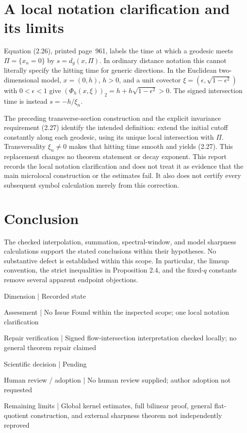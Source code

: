 \documentclass[10pt]{article}
\begin{document}
\section*{A local notation clarification and its limits}
Equation (2.26), printed page 961, labels the time at which a geodesic meets \(\Pi=\{x_n=0\}\) by \(s=d_g(x,\Pi)\). In ordinary distance notation this cannot literally specify the hitting time for generic directions. In the Euclidean two-dimensional model, \(x=(0,h)\), \(h>0\), and a unit covector \(\xi=(\epsilon,\sqrt{1-\epsilon^2})\) with \(0<\epsilon<1\) give \((\Phi_h(x,\xi))_2=h+h\sqrt{1-\epsilon^2}>0\). The signed intersection time is instead \(s=-h/\xi_n\).\par
The preceding transverse-section construction and the explicit invariance requirement (2.27) identify the intended definition: extend the initial cutoff constantly along each geodesic, using its unique local intersection with \(\Pi\). Transversality \(\xi_n\ne0\) makes that hitting time smooth and yields (2.27). This replacement changes no theorem statement or decay exponent. This report records the local notation clarification and does not treat it as evidence that the main microlocal construction or the estimates fail. It also does not certify every subsequent symbol calculation merely from this correction.\par
\section*{Conclusion}
The checked interpolation, summation, spectral-window, and model sharpness calculations support the stated conclusions within their hypotheses. No substantive defect is established within this scope. In particular, the limsup convention, the strict inequalities in Proposition 2.4, and the fixed-\(q\) constants remove several apparent endpoint objections.\par
Dimension | Recorded state\par
Assessment | No Issue Found within the inspected scope; one local notation clarification\par
Repair verification | Signed flow-intersection interpretation checked locally; no general theorem repair claimed\par
Scientific decision | Pending\par
Human review / adoption | No human review supplied; author adoption not requested\par
Remaining limits | Global kernel estimates, full bilinear proof, general flat-quotient construction, and external sharpness theorem not independently reproved\par
\end{document}
